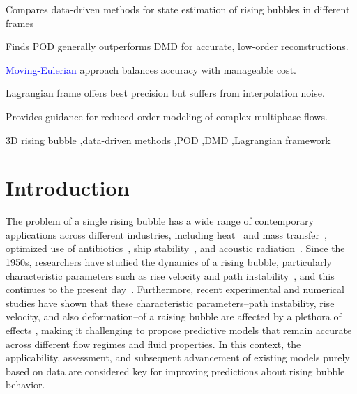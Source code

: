 \documentclass[a4paper,fleqn]{cas-sc}
\newcommand{\hl}[1]{\textcolor{blue}{#1}}
\newcommand{\hl}[1]{#1}
\begin{document}
	\begin{highlights}
		\item Compares data-driven methods for state estimation of rising bubbles in different frames
		\item Finds POD generally outperforms DMD for accurate, low-order reconstructions.
		\item \hl{Moving-Eulerian} approach balances accuracy with manageable cost.
		\item Lagrangian frame offers best precision but suffers from interpolation noise.
		\item Provides guidance for reduced-order modeling of complex multiphase flows.
	\end{highlights}
	
	\begin{keywords}
		3D rising bubble \sep data-driven methods \sep POD \sep DMD \sep Lagrangian framework
	\end{keywords}

	\maketitle
	\linenumbers
	

	\section{Introduction}
	\label{Introduction}
	
	The problem of a single rising bubble has a wide range of contemporary applications across different industries, including heat~\cite{Larimi2018} and mass transfer~\cite{Kentheswaran2023}, optimized use of antibiotics~\cite{Hamdollahi2022}, ship stability~\cite{Fang2022}, and acoustic radiation~\cite{Ouyang2021}. Since the 1950s, researchers have studied the dynamics of a rising bubble, particularly characteristic parameters such as rise velocity and path instability~\cite{Saffman1956,TSUGE1977,Duineveld1995}, and this continues to the present day~\cite{Shi2024,Bonnefis2024,Hosen2024}. Furthermore, recent experimental and numerical studies have shown that these characteristic parameters--path instability, rise velocity, and also deformation--of a raising bubble are affected by a plethora of effects \cite{Liu2006,Cano-Lozano2016,Kure2021}, making it challenging to propose predictive models that remain accurate across different flow regimes and fluid properties. In this context, the applicability, assessment, and subsequent advancement of existing models purely based on data are considered key for improving predictions about rising bubble behavior.
	
\end{document}
